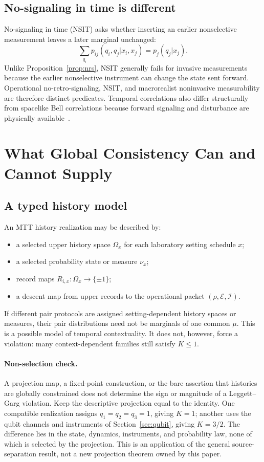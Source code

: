 \documentclass[11pt]{article}
\theoremstyle{definition}
\theoremstyle{remark}
\begin{document}
\subsection{No-signaling in time is different}

No-signaling in time (NSIT) asks whether inserting an earlier nonselective
measurement leaves a later marginal unchanged:
\[
\sum_{q_i}p_{ij}(q_i,q_j|x_i,x_j)
=p_j(q_j|x_j).
\]
Unlike Proposition~\ref{prop:nrs}, NSIT generally fails for invasive
measurements because the earlier nonselective instrument can change the
state sent forward.  Operational no-retro-signaling, NSIT, and
macrorealist noninvasive measurability are therefore distinct predicates.
Temporal correlations also differ structurally from spacelike Bell
correlations because forward signaling and disturbance are physically
available~\cite{BrierleyEtAl2015}.

\section{What Global Consistency Can and Cannot Supply}

\subsection{A typed history model}

An MTT history realization may be described by:
\begin{itemize}
\item a selected upper history space $\Omega_x$ for each laboratory setting
  schedule $x$;
\item a selected probability state or measure $\nu_x$;
\item record maps $R_{i,x}:\Omega_x\to\{\pm1\}$;
\item a descent map from upper records to the operational packet
  $(\rho,\mathcal E,\mathcal I)$.
\end{itemize}
If different pair protocols are assigned setting-dependent history spaces or
measures, their pair distributions need not be marginals of one common
$\mu$.  This is a possible model of temporal contextuality.  It does not,
however, force a violation: many context-dependent families still satisfy
$K\leq1$.

\paragraph{Non-selection check.}
A projection map, a fixed-point construction, or the bare assertion that
histories are globally constrained does not determine the sign or magnitude
of a Leggett--Garg violation.  Keep the descriptive projection equal to the
identity.  One compatible realization assigns
$q_1=q_2=q_3=1$, giving $K=1$; another uses the qubit channels and instruments
of Section~\ref{sec:qubit}, giving $K=3/2$.  The difference lies in the state,
dynamics, instruments, and probability law, none of which is selected by the
projection.  This is an application of the general source-separation result,
not a new projection theorem owned by this paper.
\end{document}
